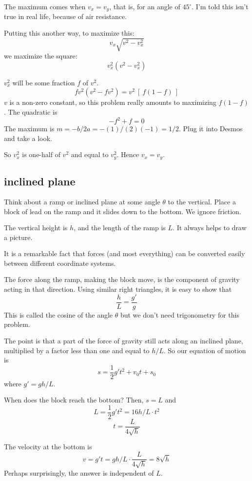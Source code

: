 \documentclass[11pt, oneside]{article}
\begin{document}
The maximum comes when $v_x = v_y$, that is, for an angle of $45^{\circ}$.  I'm told this isn't true in real life, because of air resistance.

Putting this another way, to maximize this:
\[ v_x \sqrt{v^2 - v_x^2} \]
we maximize the square:
\[ v_x^2 (v^2 - v_x^2) \]

$v_x^2$ will be some fraction $f$ of $v^2$.
\[ fv^2 (v^2 - fv^2) = v^2 \ [ \ f(1-f) \ ] \]
$v$ is a non-zero constant, so this problem really amounts to maximizing $f (1-f)$.  The quadratic is 
\[ -f^2 + f = 0 \]
The maximum is $m = -b/2a = - (1)/(2)(-1) = 1/2$.  Plug it into Desmos and take a look.

So $v_x^2$ is one-half of $v^2$ and equal to $v_y^2$.  Hence $v_x = v_y$.

\subsection*{inclined plane}

Think about a ramp or inclined plane at some angle $\theta$ to the vertical.  Place a block of lead on the ramp and it slides down to the bottom.  We ignore friction.  

The vertical height is $h$, and the length of the ramp is $L$.  It always helps to draw a picture.

It is a remarkable fact that forces (and most everything) can be converted easily between different coordinate systems.  

The force along the ramp, making the block move, is the component of gravity acting in that direction.  Using similar right triangles, it is easy to show that 
\[ \frac{h}{L} = \frac{g'}{g} \]
This is called the cosine of the angle $\theta$ but we don't need trigonometry for this problem.  

The point is that a part of the force of gravity still acts along an inclined plane, multiplied by a factor less than one and equal to $h/L$.  So our equation of motion is
\[ s = \frac{1}{2} g' t^2 + v_0 t + s_0 \]
where $g' = gh/L$.

When does the block reach the bottom?  Then, $s = L$ and
\[ L = \frac{1}{2} g' t^2 = 16 h/L \cdot t^2 \]
\[ t = \frac{L}{4 \sqrt{h}} \]

The velocity at the bottom is 
\[ v = g't = g h/L \cdot  \frac{L}{4 \sqrt{h}} = 8 \sqrt{h} \]
Perhaps surprisingly, the answer is independent of $L$.
\end{document}
